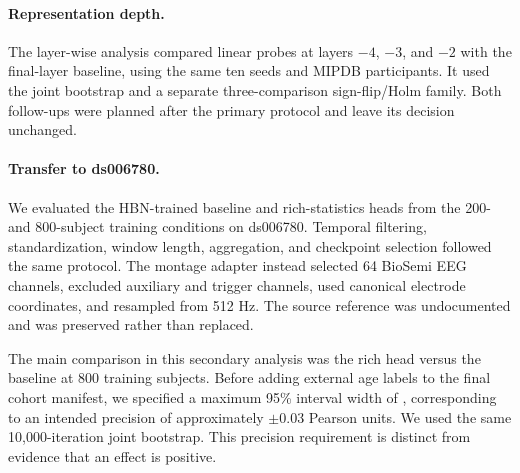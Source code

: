 \paragraph{Representation depth.}
The layer-wise analysis compared linear probes at layers $-4$, $-3$, and $-2$
with the final-layer baseline, using the same ten seeds and MIPDB participants.
It used the joint bootstrap and a separate three-comparison sign-flip/Holm
family. Both follow-ups were planned after the primary protocol and leave its
decision unchanged.

\paragraph{Transfer to ds006780.}
We evaluated the HBN-trained baseline and rich-statistics heads from the
200- and 800-subject training conditions on ds006780. Temporal filtering,
standardization, window length, aggregation, and checkpoint selection followed
the same protocol. The montage adapter instead selected 64 BioSemi EEG channels,
excluded auxiliary and trigger channels, used canonical electrode coordinates,
and resampled from 512 Hz. The source reference was undocumented and was
preserved rather than replaced.

The main comparison in this secondary analysis was the rich head versus the
baseline at 800 training subjects. Before adding external age labels to the
final cohort manifest, we specified a maximum 95\% interval width of
\DsPrecisionMaxWidth{}, corresponding to an intended precision of approximately
$\pm0.03$ Pearson units. We used the same 10,000-iteration joint bootstrap.
This precision requirement is distinct from evidence that an effect is positive.
